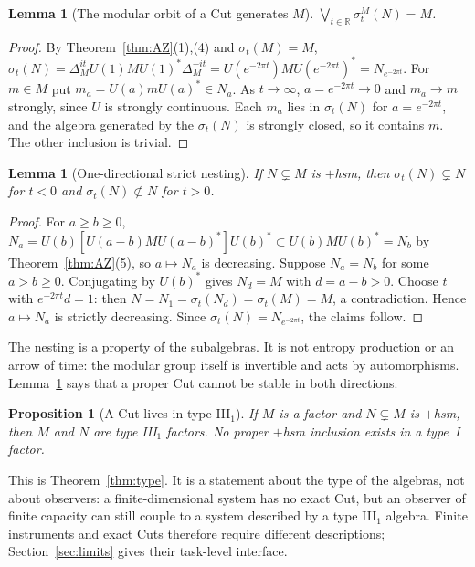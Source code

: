\documentclass[12pt]{article}
\newtheorem{proposition}[theorem]{Proposition}
\newtheorem{lemma}[theorem]{Lemma}
\theoremstyle{definition}
\theoremstyle{remark}
\begin{document}
\begin{lemma}[The modular orbit of a Cut generates \(M\)]\label{lem:orbit}
\(\bigvee_{t\in\mathbb R}\sigma^M_t(N)=M\).
\end{lemma}
\begin{proof}
By Theorem~\ref{thm:AZ}(1),(4) and \(\sigma_t(M)=M\),
\(\sigma_t(N)=\Delta_M^{it}U(1)MU(1)^*\Delta_M^{-it}=U(e^{-2\pi t})MU(e^{-2\pi t})^*
=N_{e^{-2\pi t}}\). For \(m\in M\) put \(m_a=U(a)mU(a)^*\in N_a\). As
\(t\to\infty\), \(a=e^{-2\pi t}\to0\) and \(m_a\to m\) strongly, since \(U\) is
strongly continuous. Each \(m_a\) lies in \(\sigma_t(N)\) for \(a=e^{-2\pi t}\), and
the algebra generated by the \(\sigma_t(N)\) is strongly closed, so it contains
\(m\). The other inclusion is trivial.
\end{proof}

\begin{lemma}[One-directional strict nesting]\label{lem:nest}
If \(N\subsetneq M\) is \(+\)hsm, then \(\sigma_t(N)\subsetneq N\) for \(t<0\) and
\(\sigma_t(N)\not\subset N\) for \(t>0\).
\end{lemma}
\begin{proof}
For \(a\ge b\ge0\), \(N_a=U(b)[U(a-b)MU(a-b)^*]U(b)^*\subset U(b)MU(b)^*=N_b\) by
Theorem~\ref{thm:AZ}(5), so \(a\mapsto N_a\) is decreasing. Suppose \(N_a=N_b\) for
some \(a>b\ge0\). Conjugating by \(U(b)^*\) gives \(N_d=M\) with \(d=a-b>0\). Choose
\(t\) with \(e^{-2\pi t}d=1\): then \(N=N_1=\sigma_t(N_d)=\sigma_t(M)=M\), a
contradiction. Hence \(a\mapsto N_a\) is strictly decreasing. Since
\(\sigma_t(N)=N_{e^{-2\pi t}}\), the claims follow.
\end{proof}

The nesting is a property of the subalgebras. It is not entropy production or an arrow
of time: the modular group itself is invertible and acts by automorphisms.
Lemma~\ref{lem:nest} says that a proper Cut cannot be stable in both directions.

\begin{proposition}[A Cut lives in type III\(_1\)]\label{prop:typeIII}
If \(M\) is a factor and \(N\subsetneq M\) is \(+\)hsm, then \(M\) and \(N\) are
type III\(_1\) factors. No proper \(+\)hsm inclusion exists in a type~I factor.
\end{proposition}
This is Theorem~\ref{thm:type}. It is a statement about the type of the algebras,
not about observers: a finite-dimensional system has no exact Cut, but an observer
of finite capacity can still couple to a system described by a type III\(_1\)
algebra. Finite instruments and exact Cuts therefore require different
descriptions; Section~\ref{sec:limits} gives their task-level interface.
\end{document}
